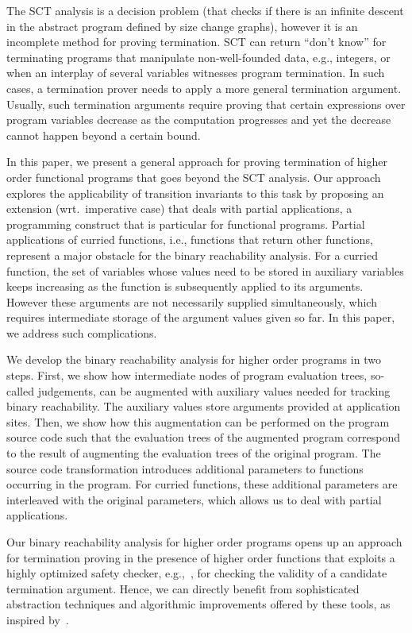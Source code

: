 The SCT analysis is a decision problem (that checks if there is an infinite descent in the abstract program defined by size change graphs), however it is an incomplete method for proving termination. 
SCT can return ``don't know'' for terminating programs that
manipulate non-well-founded data, e.g., integers, or when an interplay
of several variables witnesses program termination. 
In such cases, a termination prover needs to apply a more general termination argument.
Usually, such termination arguments require proving that certain expressions over program variables decrease as the computation progresses and yet the decrease cannot happen beyond a certain bound.

In this paper, we present a general approach for proving termination of higher order functional programs that goes beyond the SCT analysis.
Our approach explores the applicability of transition invariants to
this task by proposing an extension (wrt.\ imperative case) that deals
with partial applications, a programming construct that is particular for functional programs.
Partial applications of curried functions, i.e., functions that return other functions, represent a major obstacle for the binary reachability analysis. 
For a curried function, the set of variables whose values need to be stored in auxiliary variables keeps increasing as the function is subsequently applied to its arguments. 
However these arguments are not necessarily supplied simultaneously,
which requires intermediate storage of the argument values given so
far.
In this paper, we address such complications.

We develop the binary reachability analysis for higher order programs in two steps.
First, we show how intermediate nodes of program evaluation trees, \mbox{so-called} judgements, can be augmented with auxiliary values needed for tracking binary reachability. 
The auxiliary values store arguments provided at application sites.
Then, we show how this augmentation can be performed on the program source code such that the evaluation trees of the augmented program correspond to the result of augmenting the evaluation trees of the original program.
The source code transformation introduces additional parameters to functions occurring in the program. For curried functions, these additional parameters are interleaved with the original parameters, which allows us to deal with partial applications.

Our binary reachability analysis for higher order programs opens up an approach for termination proving in the presence of higher order functions that exploits a highly optimized safety checker, e.g.,~\cite{TerauchiPOPL10,RupakRanjit,KobayashiPLDI11,Dsolve,HMC},
for checking the validity of a candidate termination argument.
Hence, we can directly benefit from sophisticated abstraction
techniques and algorithmic improvements offered by these tools, as inspired by~\cite{copytrick}.

